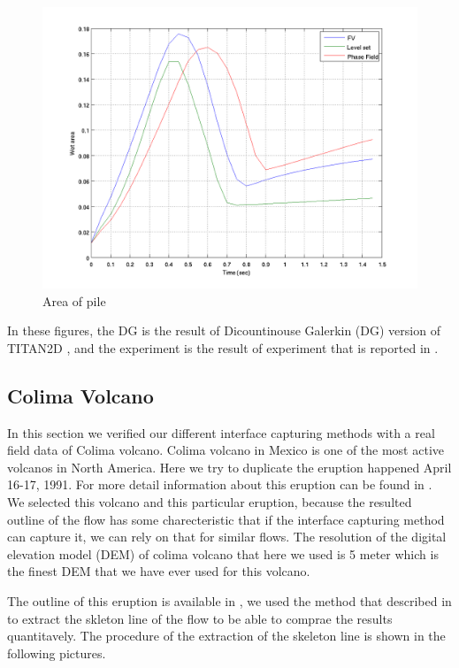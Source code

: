 \documentclass[letterpaper,10pt]{article}
\begin{document}
\begin{figure}[H]
\centerline{\includegraphics[scale=0.5]{IMAGES/Wet_area.png}}
\caption{Area of pile}
\label{wet_area}
\end{figure}

In these figures, the DG is the result of Dicountinouse Galerkin (DG) version of TITAN2D \cite{}, and the experiment is the result of experiment 
that is reported in \cite{}.


\subsection{Colima Volcano}
In this section we verified our different interface capturing methods with a real field data of Colima volcano. 
Colima volcano in Mexico is one of the most active volcanos in North America. Here we try to duplicate the eruption happened April 16-17, 1991. 
For more detail information about this eruption can be found in \cite{}. We selected this volcano and this particular eruption, because 
the resulted outline of the flow has some charecteristic that if the interface capturing method can capture it, we can  
rely on that for similar flows. 
The resolution of the digital elevation model (DEM) of colima volcano that here we used is 5 meter which is the finest DEM 
that we have ever used for this volcano.

The outline of this eruption is available in \cite{namikawa}, we used the method that described in \cite{namikawa} to 
extract the skleton line of the flow to be able to comprae the results quantitavely. The procedure of the extraction of the 
skeleton line is shown in the following pictures. 
\end{document}
